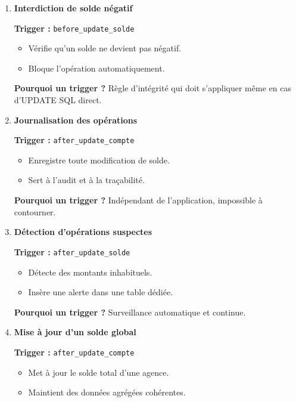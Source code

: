\documentclass[11pt]{article}
\begin{document}
\begin{enumerate}

\item \textbf{Interdiction de solde négatif}

\textbf{Trigger :} \texttt{before\_update\_solde}

\begin{itemize}
    \item Vérifie qu’un solde ne devient pas négatif.
    \item Bloque l’opération automatiquement.
\end{itemize}

\textbf{Pourquoi un trigger ?}
Règle d’intégrité qui doit s’appliquer même en cas d’UPDATE SQL direct.

\item \textbf{Journalisation des opérations}

\textbf{Trigger :} \texttt{after\_update\_compte}

\begin{itemize}
    \item Enregistre toute modification de solde.
    \item Sert à l’audit et à la traçabilité.
\end{itemize}

\textbf{Pourquoi un trigger ?}
Indépendant de l’application, impossible à contourner.

\item \textbf{Détection d’opérations suspectes}

\textbf{Trigger :} \texttt{after\_update\_solde}

\begin{itemize}
    \item Détecte des montants inhabituels.
    \item Insère une alerte dans une table dédiée.
\end{itemize}

\textbf{Pourquoi un trigger ?}
Surveillance automatique et continue.

\item \textbf{Mise à jour d’un solde global}

\textbf{Trigger :} \texttt{after\_update\_compte}

\begin{itemize}
    \item Met à jour le solde total d’une agence.
    \item Maintient des données agrégées cohérentes.
\end{itemize}


\end{enumerate}
\end{document}
